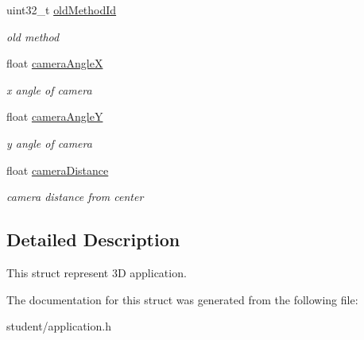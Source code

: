 \begin{DoxyCompactItemize}
\mbox{\label{structAppData_a0f81be5c1deac08d8dc42b4a00166d11}} 
uint32\+\_\+t \hyperlink{structAppData_a0f81be5c1deac08d8dc42b4a00166d11}{old\+Method\+Id}
\begin{DoxyCompactList}\small\item\em old method \end{DoxyCompactList}\item 
\mbox{\label{structAppData_a940aa8b96b641cd01005116f135064ef}} 
float \hyperlink{structAppData_a940aa8b96b641cd01005116f135064ef}{camera\+AngleX}
\begin{DoxyCompactList}\small\item\em x angle of camera \end{DoxyCompactList}\item 
\mbox{\label{structAppData_a81c378f9608263b527ac780e960bc163}} 
float \hyperlink{structAppData_a81c378f9608263b527ac780e960bc163}{camera\+AngleY}
\begin{DoxyCompactList}\small\item\em y angle of camera \end{DoxyCompactList}\item 
\mbox{\label{structAppData_a03a75b6250d4fd9f164684f8b522e9cd}} 
float \hyperlink{structAppData_a03a75b6250d4fd9f164684f8b522e9cd}{camera\+Distance}
\begin{DoxyCompactList}\small\item\em camera distance from center \end{DoxyCompactList}\end{DoxyCompactItemize}


\subsection{Detailed Description}
This struct represent 3D application. 

The documentation for this struct was generated from the following file\+:\begin{DoxyCompactItemize}
\item 
student/application.\+h\end{DoxyCompactItemize}
